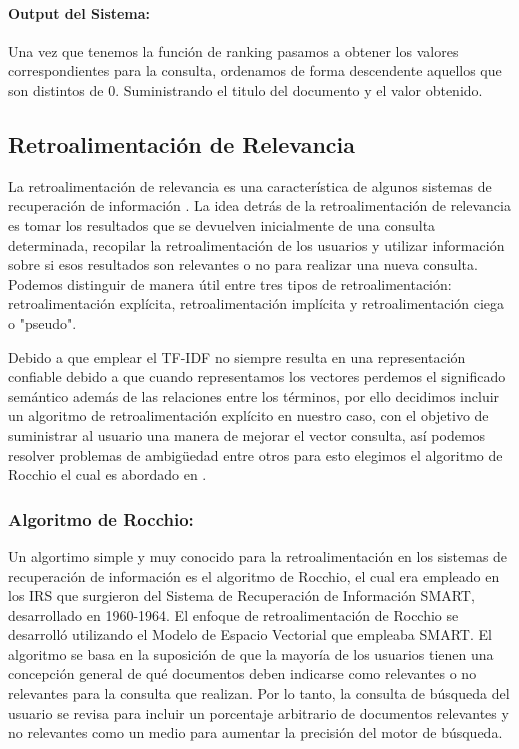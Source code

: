 \documentclass[runningheads,a4paper]{llncs}
\begin{document}
\paragraph{Output del Sistema:} Una vez que tenemos la función de ranking pasamos a obtener los valores correspondientes para la consulta, ordenamos de forma descendente aquellos que son distintos de 0. Suministrando el titulo del documento y el valor obtenido.

\subsection*{Retroalimentación de Relevancia}

La retroalimentación de relevancia es una característica de algunos sistemas de recuperación de información . La idea detrás de la retroalimentación de relevancia es tomar los resultados que se devuelven inicialmente de una consulta determinada, recopilar la retroalimentación de los usuarios y utilizar información sobre si esos resultados son relevantes o no para realizar una nueva consulta. Podemos distinguir de manera útil entre tres tipos de retroalimentación: retroalimentación explícita, retroalimentación implícita y retroalimentación ciega o "pseudo".

Debido a que emplear el TF-IDF no siempre resulta en una representación confiable debido a que cuando representamos los vectores perdemos el significado semántico además de las relaciones entre los términos, por ello decidimos incluir un algoritmo de retroalimentación explícito en nuestro caso, con el objetivo de suministrar al usuario una manera de mejorar el vector consulta, así podemos resolver problemas de ambigüedad entre otros para esto elegimos el algoritmo de Rocchio el cual es abordado en \cite{rocchio}.

\subsubsection*{Algoritmo de Rocchio:} Un algortimo simple y muy conocido para la retroalimentación en los sistemas de recuperación de información es el algoritmo de Rocchio, el cual era empleado en los IRS que surgieron del Sistema de Recuperación de Información SMART, desarrollado en 1960-1964. El enfoque de retroalimentación de Rocchio se desarrolló utilizando el Modelo de Espacio Vectorial que empleaba SMART. El algoritmo se basa en la suposición de que la mayoría de los usuarios tienen una concepción general de qué documentos deben indicarse como relevantes o no relevantes para la consulta que realizan. Por lo tanto, la consulta de búsqueda del usuario se revisa para incluir un porcentaje arbitrario de documentos relevantes y no relevantes como un medio para aumentar la precisión del motor de búsqueda.
\end{document}
